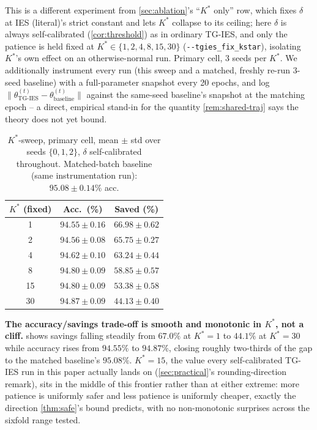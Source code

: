 \documentclass{article}
\theoremstyle{plain}
\theoremstyle{definition}
\theoremstyle{remark}
\begin{document}
This is a different experiment from \cref{sec:ablation}'s ``$K^*$ only'' row, which fixes $\delta$ at IES (literal)'s strict constant and lets $K^*$ collapse to its ceiling; here $\delta$ is always self-calibrated (\cref{cor:threshold}) as in ordinary TG-IES, and only the patience is held fixed at $K^*\in\{1,2,4,8,15,30\}$ (\texttt{-{}-tgies\_fix\_kstar}), isolating $K^*$'s own effect on an otherwise-normal run. Primary cell, 3 seeds per $K^*$. We additionally instrument every run (this sweep and a matched, freshly re-run 3-seed baseline) with a full-parameter snapshot every 20 epochs, and log $\|\theta^{(t)}_{\mathrm{TG\text{-}IES}} - \theta^{(t)}_{\mathrm{baseline}}\|$ against the same-seed baseline's snapshot at the matching epoch -- a direct, empirical stand-in for the quantity \cref{rem:shared-traj} says the theory does not yet bound.

\begin{table}[h]
\caption{$K^*$-sweep, primary cell, mean $\pm$ std over seeds $\{0,1,2\}$, $\delta$ self-calibrated throughout. Matched-batch baseline (same instrumentation run): $95.08\pm0.14\%$ acc.}
\label{tab:kstarsweep}
\vskip 0.1in
\begin{center}
\begin{small}
\begin{tabular}{ccc}
\toprule
$K^*$ (fixed) & Acc.\ (\%) & Saved (\%) \\
\midrule
1  & $94.55\pm0.16$ & $\mathbf{66.98\pm0.62}$ \\
2  & $94.56\pm0.08$ & $65.75\pm0.27$ \\
4  & $94.62\pm0.10$ & $63.24\pm0.44$ \\
8  & $94.80\pm0.09$ & $58.85\pm0.57$ \\
15 & $94.80\pm0.09$ & $53.38\pm0.58$ \\
30 & $\mathbf{94.87\pm0.09}$ & $44.13\pm0.40$ \\
\bottomrule
\end{tabular}
\end{small}
\end{center}
\vskip -0.1in
\end{table}

\textbf{The accuracy/savings trade-off is smooth and monotonic in $K^*$, not a cliff.}  shows savings falling steadily from $67.0\%$ at $K^*{=}1$ to $44.1\%$ at $K^*{=}30$ while accuracy rises from $94.55\%$ to $94.87\%$, closing roughly two-thirds of the gap to the matched baseline's $95.08\%$. $K^*{=}15$, the value every self-calibrated TG-IES run in this paper actually lands on (\cref{sec:practical}'s rounding-direction remark), sits in the middle of this frontier rather than at either extreme: more patience is uniformly safer and less patience is uniformly cheaper, exactly the direction \cref{thm:safe}'s bound predicts, with no non-monotonic surprises across the sixfold range tested.
\end{document}
